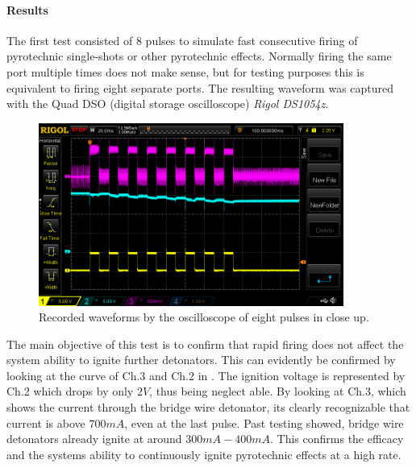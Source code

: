 \paragraph{Results}
\label{Results}

\noindent The first test consisted of 8 pulses to simulate fast consecutive firing of pyrotechnic single-shots or other pyrotechnic effects. Normally firing the same port multiple times does not make sense, but for testing purposes this is equivalent to firing eight separate ports. The resulting waveform was captured with the Quad DSO (digital storage oscilloscope) \textit{Rigol DS1054z}.\\

\begin{figure}[!ht]
    \centering
    \includegraphics[width=10cm]{./Figures/eight_pulses_close.png}
    \caption{Recorded waveforms by the oscilloscope of eight pulses in close up.}
    \label{fig:eight_pulses_close}     
\end{figure}
 
\noindent The main objective of this test is to confirm that rapid firing does not affect the system ability to ignite further detonators. This can evidently be confirmed by looking at the curve of Ch.3 and Ch.2 in . The ignition voltage is represented by Ch.2 which drops by only $2V$, thus being neglect able. By looking at Ch.3, which shows the current through the bridge wire detonator, its clearly recognizable that current is above $700mA$, even at the last pulse. Past testing showed, bridge wire detonators already ignite at around $300mA-400mA$. This confirms the efficacy and the systems ability to continuously ignite pyrotechnic effects at a high rate.

\pagebreak


